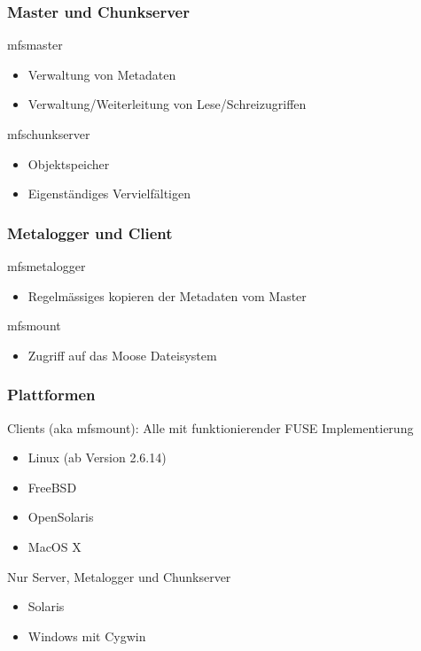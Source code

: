 \documentclass{beamer}
\begin{document}
\begin{frame}
	\frametitle{Master und Chunkserver}
	\begin{block}{mfsmaster}
	\begin{itemize}
		\item Verwaltung von Metadaten
		\item Verwaltung/Weiterleitung von Lese/Schreizugriffen
	\end{itemize}
	\end{block}

	\begin{block}{mfschunkserver}
	\begin{itemize}	
		\item Objektspeicher
		\item Eigenst\"andiges Vervielf\"altigen 
	\end{itemize}
	\end{block}
\end{frame}

\begin{frame}
	\frametitle{Metalogger und Client}

	\begin{block}{mfsmetalogger}
	\begin{itemize}
		\item Regelm\"assiges kopieren der Metadaten vom Master
	\end{itemize}
	\end{block}

	\begin{block}{mfsmount}
	\begin{itemize}
		\item Zugriff auf das Moose Dateisystem
	\end{itemize}
	\end{block}
\end{frame}

\begin{frame}
	\frametitle{Plattformen}
	\begin{block}{Clients (aka mfsmount): Alle mit funktionierender FUSE Implementierung}
	\begin{itemize}
		\item Linux (ab Version 2.6.14)
		\item FreeBSD
		\item OpenSolaris
		\item MacOS X
	\end{itemize}
	\end{block}
	\begin{block}{Nur Server, Metalogger und Chunkserver}
	\begin{itemize}
		\item Solaris 
		\item Windows mit Cygwin
	\end{itemize}
	\end{block}
\end{frame}
\end{document}
